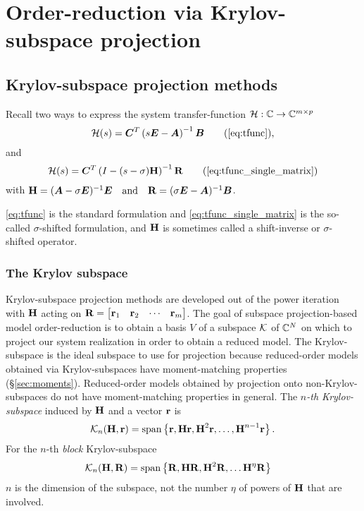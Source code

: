 \chapter{Order-reduction via Krylov-subspace projection}
\label{ch:krylov_MOR_background}
\section{Krylov-subspace  projection methods}\label{sec:projection}
Recall two ways to express the system transfer-function $\mathcal{H}:\mathbb{C} \rightarrow \mathbb{C}^{m \times p}$
\begin{equation}
                \tf(s) = \CC^T\left(s\E-\A\right)^{-1}\BB \tag{\ref{eq:tfunc}}, 
\end{equation}
and
\begin{equation}
\tf(s) = \CC^T\left(I-(s-\sigma)\H\right)^{-1} \RR \tag{\ref{eq:tfunc_single_matrix}}
\end{equation}
with $\textbf{\textup{H}} = (\bm{A} - \sigma \bm{E})^{-1}\bm{E}\quad\textrm{and}\quad \textbf{\textup{R}} = (\sigma \bm{E}-\bm{A})^{-1}\bm{B}$.  

 \eqref{eq:tfunc} is the standard formulation and \eqref{eq:tfunc_single_matrix} is the so-called $\sigma$-shifted formulation, and $\textbf{\textup{H}}$ is sometimes called a shift-inverse or $\sigma$-shifted operator.  


\subsection{The Krylov subspace}
Krylov-subspace  projection methods are developed out of the power iteration with $\textbf{\textup{H}}$ acting on $\textbf{\textup{R}}=\begin{bmatrix} \textbf{\textup{r}}_1 & \textbf{\textup{r}}_2 & \cdots & \textbf{\textup{r}}_m\end{bmatrix}$.
   The goal of subspace  projection-based model order-reduction is to obtain a basis $V$ of a subspace  $\mathcal{K}$ of $\mathbb{C}^N$ on which to project our system realization in order to obtain a reduced model.    The Krylov-subspace  is the ideal subspace  to use for projection because  reduced-order models obtained via Krylov-subspaces  have moment-matching properties (\S\ref{sec:moments}).
Reduced-order models obtained by projection onto non-Krylov-subspaces  do not have moment-matching properties in general. 
     The \emph{$n$-th Krylov-subspace} induced by $\textbf{\textup{H}}$ and a vector $\textbf{\textup{r}}$ is
      \begin{equation}
          \mathcal{K}_{n}({\textbf{\textup{H}}},{\textbf{\textup{r}}})= \operatorname*{span} \left\{\textbf{\textup{r}}, \textbf{\textup{H}} \textbf{\textup{r}}, \textbf{\textup{H}}^2\textbf{\textup{r}},\ldots, \textbf{\textup{H}}^{n-1}\textbf{\textup{r}}\right\}.
          \label{eq:krylov_def}
      \end{equation}
For the $n$-th \emph{block} Krylov-subspace 
	\begin{align}
          \mathcal{K}_{n}({\textbf{\textup{H}}},{\textbf{\textup{R}}})
             &= \operatorname*{span} \left\{\textbf{\textup{R}}, \textbf{\textup{H}} \textbf{\textup{R}}, \textbf{\textup{H}}^2\textbf{\textup{R}},\ldots\textbf{\textup{H}}^\eta\textbf{\textup{R}}\right\}
	\label{eq:block_krylov_def}
      \end{align}
$n$ is the dimension of the subspace, not the number $\eta$ of powers of $\textbf{\textup{H}}$ that are involved.   

